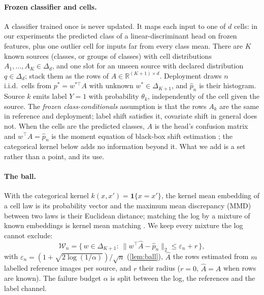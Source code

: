 \documentclass[twoside]{article}
\begin{document}
\paragraph{Frozen classifier and cells.} A classifier trained once is never updated. It maps each
input to one of $d$ cells: in our experiments the predicted class of a linear-discriminant head on
frozen features, plus one outlier cell for inputs far from every class mean. There are $K$ known
sources (classes, or groups of classes) with cell distributions $A_1,\dots,A_K\in\Delta_d$, and one
slot for an unseen source with declared distribution $q\in\Delta_d$; stack them as the rows of
$A\in\mathbb{R}^{(K+1)\times d}$. Deployment draws $n$ i.i.d.\ cells from $p^{*}=w^{*\top}A$ with
unknown $w^{*}\in\Delta_{K+1}$, and $\hat p_n$ is their histogram. Source $k$ emits label $Y=1$ with
probability $\theta_k$, independently of the cell given the source. The \emph{frozen
class-conditionals} assumption is that the rows $A_k$ are the same in reference and deployment;
label shift satisfies it, covariate shift in general does not. When the cells are the predicted
classes, $A$ is the head's confusion matrix and $w^{\top}A=\hat p_n$ is the moment equation of
black-box shift estimation \citep{lipton2018detecting}; the categorical kernel below adds no
information beyond it. What we add is a set rather than a point, and its use.

\paragraph{The ball.} With the categorical kernel $k(x,x')=\mathbf 1\{x=x'\}$, the kernel mean
embedding of a cell law is its probability vector and the maximum mean discrepancy (MMD) between two
laws is their Euclidean distance; matching the log by a mixture of known embeddings is kernel mean
matching \citep{zhang2013domain,iyer2014maximum}. We keep every mixture the log cannot exclude:
\begin{equation}
\mathcal W_n=\{\,w\in\Delta_{K+1}:\ \lVert w^{\top}\hat A-\hat p_n\rVert_2\le \varepsilon_n+r\,\},
\label{eq:ball}
\end{equation}
with $\varepsilon_n=(1+\sqrt{2\log(1/\alpha)})/\sqrt n$ (\cref{lem:ball}), $\hat A$ the rows estimated
from $m$ labelled reference images per source, and $r$ their radius ($r=0$, $\hat A=A$ when rows are
known). The failure budget $\alpha$ is split between the log, the references and the label channel.
\end{document}
